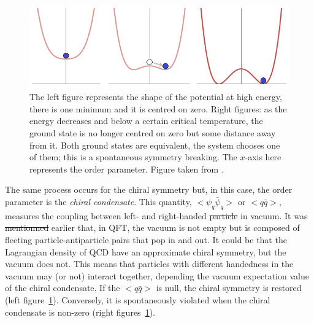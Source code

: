 \documentclass[ALICE,manyauthors]{cernphprep}
\providecommand{\DIFaddtex}[1]{{\protect\color{blue}\uwave{#1}}} %
\providecommand{\DIFdeltex}[1]{{\protect\color{red}\sout{#1}}}                      %
\providecommand{\DIFaddbegin}{} %
\providecommand{\DIFaddend}{} %
\providecommand{\DIFdelbegin}{} %
\providecommand{\DIFdelend}{} %
\providecommand{\DIFadd}[1]{\texorpdfstring{\DIFaddtex{#1}}{#1}} %
\providecommand{\DIFdel}[1]{\texorpdfstring{\DIFdeltex{#1}}{}} %
\newcommand{\DIFscaledelfig}{0.5}
\newlength{\DIFdelgraphicswidth} %
\newlength{\DIFdelgraphicsheight} %
\newcommand{\DIFaddincludegraphics}[2][]{{\color{blue}\fbox{\DIFOincludegraphics[#1]{#2}}}} %
\newcommand{\DIFdelincludegraphics}[2][]{%
\sbox{\DIFdelgraphicsbox}{\DIFOincludegraphics[#1]{#2}}%
\settoboxwidth{\DIFdelgraphicswidth}{\DIFdelgraphicsbox} %
\settoboxtotalheight{\DIFdelgraphicsheight}{\DIFdelgraphicsbox} %
\scalebox{\DIFscaledelfig}{%
\parbox[b]{\DIFdelgraphicswidth}{\usebox{\DIFdelgraphicsbox}\\[-\baselineskip] \rule{\DIFdelgraphicswidth}{0em}}\llap{\resizebox{\DIFdelgraphicswidth}{\DIFdelgraphicsheight}{%
\setlength{\unitlength}{\DIFdelgraphicswidth}%
\begin{picture}(1,1)%
\thicklines\linethickness{2pt} %
{\color[rgb]{1,0,0}\put(0,0){\framebox(1,1){}}}%
{\color[rgb]{1,0,0}\put(0,0){\line( 1,1){1}}}%
{\color[rgb]{1,0,0}\put(0,1){\line(1,-1){1}}}%
\end{picture}%
}\hspace*{3pt}}} %
} %
\DeclareRobustCommand{\DIFaddbegin}{\DIFOaddbegin \let\includegraphics\DIFaddincludegraphics} %
\DeclareRobustCommand{\DIFaddend}{\DIFOaddend \let\includegraphics\DIFOincludegraphics} %
\DeclareRobustCommand{\DIFdelbegin}{\DIFOdelbegin \let\includegraphics\DIFdelincludegraphics} %
\DeclareRobustCommand{\DIFdelend}{\DIFOaddend \let\includegraphics\DIFOincludegraphics} %
\begin{document}
\begin{figure}[h]
	\centering
	\includegraphics[width=\textwidth]{Figs/Chapter2/Spontaneous_symmetry_breaking_(explanatory_diagram).png}
	\caption{The left figure represents the shape of the potential at high energy, there is one minimum and it is centred on zero. Right figures: as the energy decreases and below a certain critical temperature, the ground state is no longer centred on zero but some distance away from it. Both ground states are equivalent, the system chooses one of them; this is a spontaneous symmetry breaking. The $x$-axis here represents the order parameter. Figure taken from \cite{ft2EnglishExplanatoryDiagram2012}.}
	\label{fig:ChiralSymmetryBreaking}
\end{figure}

The same process occurs for the chiral symmetry but, in this case, the order parameter is the \textit{chiral condensate}. This quantity, $< \psi_{q} \bar{\psi}_{q} > $ or $ < q \bar{q} >$, measures the coupling between left- and right-handed \DIFdelbegin \DIFdel{particle }\DIFdelend \DIFaddbegin \DIFadd{particles }\DIFaddend in vacuum. It was \DIFdelbegin \DIFdel{mentionned }\DIFdelend \DIFaddbegin \DIFadd{mentioned }\DIFaddend earlier that, in QFT, the vacuum is not empty but is composed of fleeting particle-antiparticle pairs that pop in and out. It could be that the Lagrangian density of QCD have an approximate chiral symmetry, but the vacuum does not. This means that particles with different handedness in the vacuum may (or not) interact together, depending the vacuum expectation value of the chiral condensate. If the $ < q \bar{q} >$ is null, the chiral symmetry is restored (left figure~\ref{fig:ChiralSymmetryBreaking}). Conversely, it is spontaneously violated when the chiral condensate is non-zero (right figures~\ref{fig:ChiralSymmetryBreaking}).
\end{document}
